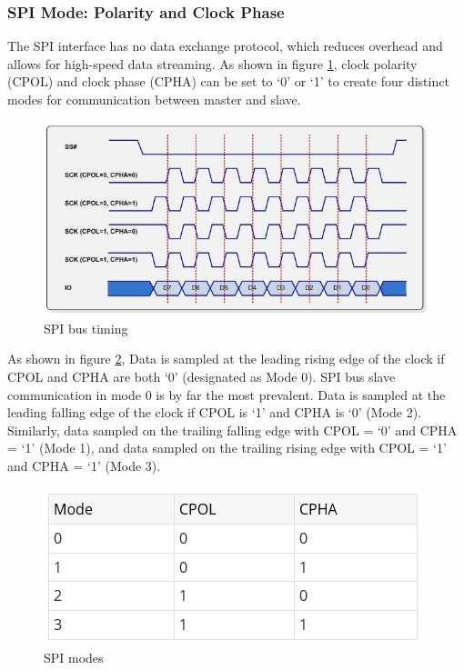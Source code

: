 \subsubsection{SPI Mode: Polarity and Clock Phase}
The SPI interface has no data exchange protocol, which reduces overhead and allows for high-speed data streaming. As shown in figure \ref{fig:spi-timing}, clock polarity (CPOL) and clock phase (CPHA) can be set to ‘0’ or ‘1’ to create four distinct modes for communication between master and slave.
\begin{figure}[h]
   \centering
    \includegraphics[width=\textwidth]{figure/3_8.jpg}
    \caption{SPI bus timing}
    \label{fig:spi-timing}
\end{figure}

As shown in figure \ref{fig:spi-modes}, Data is sampled at the leading rising edge of the clock if CPOL and CPHA are both ‘0’ (designated as Mode 0). SPI bus slave communication in mode 0 is by far the most prevalent. Data is sampled at the leading falling edge of the clock if CPOL is ‘1’ and CPHA is ‘0’ (Mode 2). Similarly, data sampled on the trailing falling edge with CPOL = ‘0’ and CPHA = ‘1’ (Mode 1), and data sampled on the trailing rising edge with CPOL = ‘1’ and CPHA = ‘1’ (Mode 3).

\begin{figure}[h]
   \centering
    \includegraphics[width=\textwidth]{figure/3_9.PNG}
    \caption{SPI modes}
    \label{fig:spi-modes}
\end{figure}


